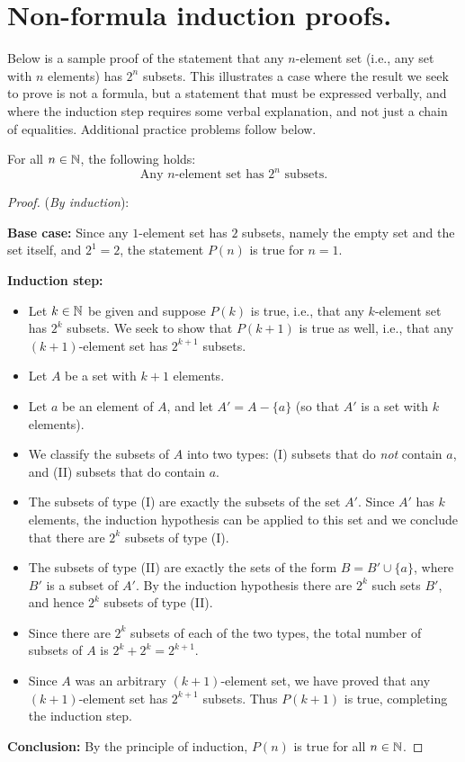 \section{Non-formula induction proofs.}
Below is a sample proof of the statement that any $n$-element set (i.e.,
any set with $n$ elements) has $2^n$ subsets. 
This illustrates a case where the result we seek to prove is not a
formula, but a statement that must be expressed verbally, and where the
induction step requires some verbal explanation, and not just a chain of
equalities.  Additional practice  problems follow below.


\begin{prop}{}
For all $n\in\mathbb{N}$, the following holds:
\[
{\text{Any $n$-element set has $2^n$ subsets.}}
\tag{$P(n)$}
\]
\end{prop}
\begin{proof}(\emph{By induction}):

\textbf{Base case:} Since any $1$-element set has $2$
subsets, namely the empty set and the set itself,
and $2^1=2$, the statement $P(n)$ is true for $n=1$.

\textbf{Induction step:} 
\begin{itemize}
\item 
Let $k\in\mathbb{N}$ be given and suppose 
$P(k)$ is true, i.e., that any $k$-element set has $2^k$ subsets.
We seek to show that $P(k+1)$  is true as well,
i.e., that any $(k+1)$-element set has $2^{k+1}$ subsets.

\item 
Let $A$ be a set with $k+1$ elements.  

\item 
Let $a$ be an element of $A$, and let $A'=A-\{a\}$ (so that   
$A'$ is a set with $k$ elements).

\item 
We classify the subsets of $A$ into two types: (I) subsets that do
\emph{not} contain $a$, and (II) subsets that do contain $a$.

\item 
The subsets of type (I) are exactly the subsets of the set
$A'$. Since $A'$ has $k$ elements, the induction
hypothesis can be applied to this set and we conclude that there are $2^k$
subsets of type (I).

\item 
The subsets of type (II) are exactly the sets of the form $B=B'\cup
\{a\}$, where $B'$ is a subset of $A'$.
By the induction hypothesis there are $2^k$ such sets $B'$, and hence
$2^k$ subsets of type (II).

\item 
Since there are $2^k$ subsets of each of the two types, the total number
of subsets of  $A$ is $2^k+2^k=2^{k+1}$. 

\item 
Since $A$ was an arbitrary $(k+1)$-element set, we have proved that any
$(k+1)$-element set has $2^{k+1}$ subsets.
Thus $P(k+1)$ is true, completing the induction step. 
\end{itemize}

\textbf{Conclusion:} By the principle of induction, 
$P(n)$  is true for all $n\in\mathbb{N}$.
\end{proof}

